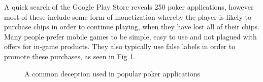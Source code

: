 \documentclass[11pt]{article}
\begin{document}
{A quick search of the Google Play Store reveals 250 poker applications, however most of these include some form of monetization whereby the player is likely to purchase chips in order to continue playing, when they have lost all of their chips. Many people prefer mobile games to be simple, easy to use and not plagued with offers for in-game products. They also typically use false labels in order to promote these purchases, as seen in Fig 1.


\begin{center}

\begin{figure}[h]
	
	\caption{A common deception used in popular poker applications}
	
\end{figure}
	

\end{center}}
\end{document}
